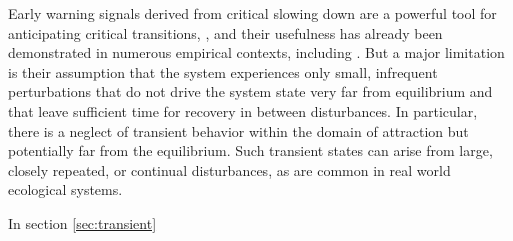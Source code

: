 Early warning signals derived from critical slowing down are a powerful tool for anticipating critical transitions, , and their usefulness has already been demonstrated in numerous empirical contexts, including . But a major limitation is their assumption that the system experiences only small, infrequent perturbations that do not drive the system state very far from equilibrium and that leave sufficient time for recovery in between disturbances. In particular, there is a neglect of transient behavior within the domain of attraction but potentially far from the equilibrium. Such transient states can arise from large, closely repeated, or continual disturbances, as are common in real world ecological systems.  

In section \ref{sec:transient} 























